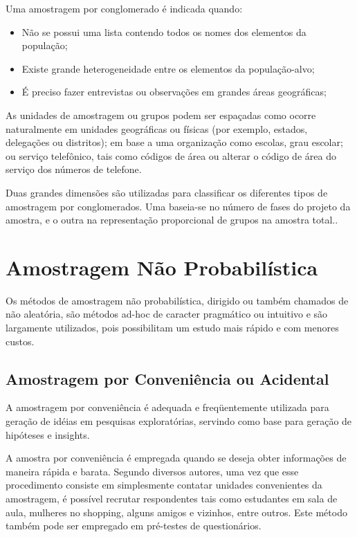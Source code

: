 Uma amostragem por conglomerado é indicada quando:

\begin{itemize}
  \item Não se possui uma lista contendo todos os nomes dos elementos da população;
  \item Existe grande heterogeneidade entre os elementos da população-alvo;
  \item É preciso fazer entrevistas ou observações em grandes áreas geográficas;
\end{itemize}


As unidades de amostragem ou grupos podem ser espaçadas como ocorre naturalmente em unidades geográficas ou físicas (por exemplo, estados, delegações ou distritos); em base  a uma organização como escolas, grau escolar; ou serviço telefônico, tais como códigos de área ou alterar o código de área do serviço dos números de telefone.\vskip0.3cm

Duas grandes dimensões são utilizadas para classificar os diferentes tipos de amostragem por conglomerados. Uma baseia-se no número de fases do projeto da amostra, e o outra na representação proporcional de grupos na amostra total..\vskip0.3cm

\section{Amostragem Não Probabilística}

Os métodos de amostragem não probabilística, dirigido ou também chamados de não aleatória, são métodos ad-hoc de caracter pragmático ou intuitivo e são largamente utilizados, pois possibilitam um
estudo mais rápido e com menores custos.

\subsection{Amostragem por Conveniência ou Acidental}

A amostragem por conveniência é adequada e freqüentemente utilizada para geração de idéias em pesquisas exploratórias, servindo como base para geração de hipóteses e insights.\vskip0.3cm

A amostra por conveniência é empregada quando se deseja obter informações de maneira rápida e barata. Segundo diversos autores, uma vez que esse procedimento consiste em simplesmente contatar unidades convenientes da amostragem, é possível recrutar respondentes tais como estudantes em sala de aula, mulheres no shopping, alguns amigos e vizinhos, entre outros. Este método também pode ser empregado em pré-testes de questionários.\vskip0.3cm

